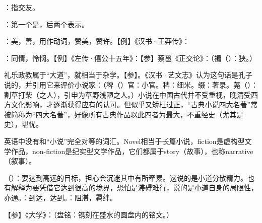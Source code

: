 {
\item {}：指交友。
\item {}：第一个是，后两个表示。
\item {}：美，善，用作动词，赞美，赞许。【例】《汉书·王莽传》：

：同情，怜悯。【例】《左传·僖公十五年》：【参】蔡邕《正交论》：（褊（）：狭。）
}
{}


{
\item 礼乐政教属于“大道”，就相当于杂学。【参】。《汉书·艺文志》认为这句话是孔子说的，并引用它来评价小说家：（稗（）官：小官。稗：细米。缀：著录。荛（）：割草打柴（之人），引申为草野浅陋之人。）小说在中国古代并不受重视，晚清受西方文化影响，才逐渐获得应有的认可。但似乎又矫枉过正，“古典小说四大名著”常被简称为“四大名著”，好像所有古典作品以此四者为最大，不重经史（尤其是史），堪忧。

英语中没有和“小说”完全对等的词汇。Novel相当于长篇小说，fiction是虚构型文学作品，non-fiction是纪实型文学作品，它们都属于story（故事），也称narrative（叙事）。

\item {}（）：要达到高远的目标，担心会沉迷其中有所牵累。这说的是小道分散精力。也有解释为要凭借它达到很高的境界，恐怕是滞碍难行，说的是小道自身的局限性，亦通。：到达，达到。：阻滞，羁绊。
}
{}


{
【参】《大学》：（盘铭：镌刻在盛水的圆盘内的铭文。）
}
{}  %


